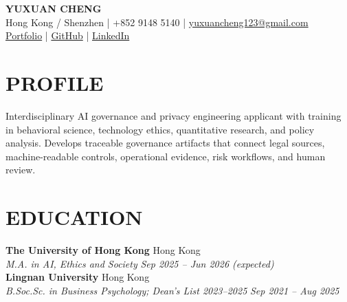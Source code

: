 \documentclass[10pt]{article}
\newcommand{\entry}[4]{%
  \textbf{#1} \hfill {#2}\\
  \textit{#3} \hfill \textit{#4}\\[-4pt]
}
\begin{document}
\begin{center}
  {\fontsize{20}{22}\selectfont\textbf{YUXUAN CHENG}}\\[3pt]
  Hong Kong / Shenzhen \quad | \quad +852 9148 5140 \quad | \quad \href{mailto:yuxuancheng123@gmail.com}{yuxuancheng123@gmail.com}\\[-1pt]
  \href{https://yuxuan-cheng-portfolio-next.vercel.app}{Portfolio} \quad | \quad \href{https://github.com/yuxuancheng123-spec}{GitHub} \quad | \quad \href{https://www.linkedin.com/in/yuxuan-cheng-86743631a}{LinkedIn}
\end{center}

\section*{PROFILE}
Interdisciplinary AI governance and privacy engineering applicant with training in behavioral science, technology ethics, quantitative research, and policy analysis. Develops traceable governance artifacts that connect legal sources, machine-readable controls, operational evidence, risk workflows, and human review.

\section*{EDUCATION}
\entry{The University of Hong Kong}{Hong Kong}{M.A. in AI, Ethics and Society}{Sep 2025 -- Jun 2026 (expected)}
\vspace{-2pt}
\entry{Lingnan University}{Hong Kong}{B.Soc.Sc. in Business Psychology; Dean's List 2023--2025}{Sep 2021 -- Aug 2025}
\end{document}
